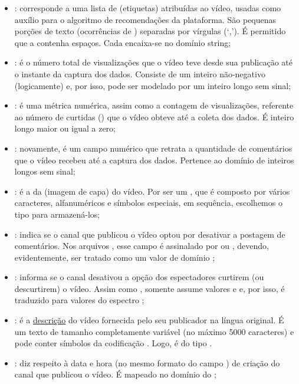 \begin{itemize}
    \item {}: corresponde a uma lista de  (etiquetas) atribuídas ao vídeo, usadas como auxílio para o algoritmo de recomendações da plataforma. São pequenas porções de texto (ocorrências de ) separadas por vírgulas (`,'). É permitido que a  contenha espaços. Cada  encaixa-se no domínio string;
    \item {}: é o número total de visualizações que o vídeo teve desde sua publicação até o instante da captura dos dados. Consiste de um inteiro não-negativo (logicamente) e, por isso, pode ser modelado por um inteiro longo sem sinal;
    \item {}: é uma métrica numérica, assim como a contagem de visualizações, referente ao número de curtidas () que o vídeo obteve até a coleta dos dados. É inteiro longo maior ou igual a zero;
    \item {}: novamente, é um campo numérico que retrata a quantidade de comentários que o vídeo recebeu até a captura dos dados. Pertence ao domínio de inteiros longos sem sinal;
    \item {}: é a  da  (imagem de capa) do vídeo. Por ser um , que é composto por vários caracteres, alfanuméricos e símbolos especiais, em sequência, escolhemos o tipo  para armazená-los;
    \item {}: indica se o canal que publicou o vídeo optou por desativar a postagem de comentários. Nos arquivos , esse campo é assinalado por  ou , devendo, evidentemente, ser tratado como um valor de domínio ;
    \item {}: informa se o canal desativou a opção dos espectadores curtirem (ou descurtirem) o vídeo. Assim como , somente assume valores  e  e, por isso, é traduzido para valores do espectro ;
    \item {}: é a \href{https://developers.google.com/youtube/v3/docs/videos?hl=pt-br#snippet.description}{descrição} do vídeo fornecida pelo seu publicador na língua original. É um texto de tamanho completamente variável (no máximo 5000 caracteres) e pode conter símbolos da codificação . Logo, é do tipo .
    \item {}: diz respeito à data e hora (no mesmo formato  do campo ) de criação do canal que publicou o vídeo. É mapeado no domínio  do ;

\end{itemize}
